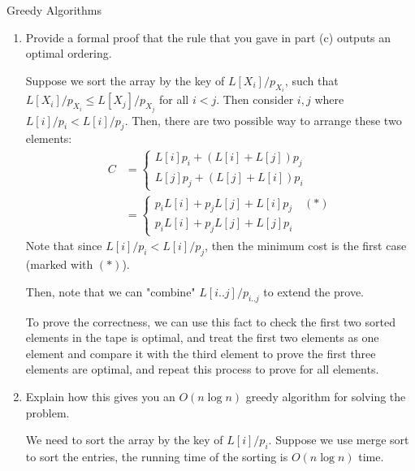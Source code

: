\documentclass{article}
\numberwithin{table}{section}
\numberwithin{figure}{section}
\begin{document}
\begin{section}{Greedy Algorithms}
\begin{enumerate}
    \item Provide a formal proof that the rule that you gave in part (c) outputs an optimal ordering.
    \begin{tcolorbox}
    Suppose we sort the array by the key of $L[X_i]/p_{X_i}$, such that $L[X_i]/p_{X_i} \leq L[X_j]/p_{X_j}$ for all $i < j$.  
    Then consider $i, j$ where $L[i]/p_{i} < L[i]/p_{j}$. Then, there are two possible way to arrange these two elements:
    \begin{align*}
        C &= 
        \begin{cases}
            L[i]p_{i} + (L[i] + L[j]) p_{j} \\
            L[j]p_{j} + (L[j] + L[i]) p_{i}
        \end{cases} \\
        &= 
        \begin{cases}
             p_{i}L[i] + p_{j}L[j] + L[i]p_{j} \quad (*) \\
             p_{i}L[i] + p_{j}L[j] + L[j]p_{i}
        \end{cases}
    \end{align*}
    Note that since $L[i]/p_{i} < L[i]/p_{j}$, then the minimum cost is the first case (marked 
    with $(*)$). 
    
    Then, note that we can "combine" $L[i..j]/p_{i..j}$ to extend the prove.
    
    To prove the correctness, we can use this fact to check the first two sorted elements in the tape is optimal, and treat the first two elements as one element and compare it with the third element to prove the first three elements are optimal, and repeat this process to prove for all elements.
    \end{tcolorbox}
    
    \item Explain how this gives you an $O(n \log n)$ greedy algorithm for solving the problem.
    \begin{tcolorbox}
    We need to sort the array by the key of $L[i]/p_i$. Suppose we use merge sort to sort the entries, the running time of the sorting is $O(n \log n)$ time. 
    \end{tcolorbox}
\end{enumerate}
\end{section}
\end{document}
